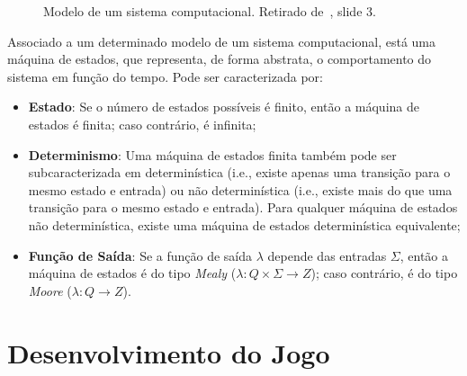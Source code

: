 \begin{figure}[H]
    \begin{center}
    \end{center}
    \caption{Modelo de um sistema computacional.
    Retirado de~\cite{isel:iasa:slides:intro-eng-soft-parte-3}, slide 3.}\label{fig:modelo-sistema-computacional}
\end{figure}

Associado a um determinado modelo de um sistema computacional, está uma máquina de estados, que representa, de forma abstrata, o comportamento do sistema em função do tempo. Pode ser caracterizada por:

\begin{itemize}
    \item \textbf{Estado}: Se o número de estados possíveis é finito, então a máquina de estados é finita; caso contrário, é infinita;
    \item \textbf{Determinismo}: Uma máquina de estados finita também pode ser subcaracterizada em determinística (i.e., existe apenas uma transição para o mesmo estado e entrada) ou não determinística (i.e., existe mais do que uma transição para o mesmo estado e entrada).
    Para qualquer máquina de estados não determinística, existe uma máquina de estados determinística equivalente; \cite{wiki:finite-state-machine,freecodecamp:state-machines}
    \item \textbf{Função de Saída}: Se a função de saída $\lambda$ depende das entradas $\Sigma$, então a máquina de estados é do tipo \textit{Mealy} ($\lambda : Q \times \Sigma \rightarrow Z$); caso contrário, é do tipo \textit{Moore} ($\lambda : Q \rightarrow Z$).
\end{itemize}


\section{Desenvolvimento do Jogo}\label{sec:desenvolvimento-do-jogo}

